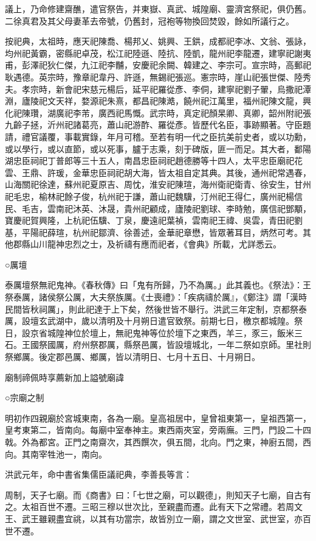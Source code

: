 議上，乃命修建齋醮，遣官祭告，并東嶽、真武、城隍廟、靈濟宮祭祀，俱仍舊。二徐真君及其父母妻革去帝號，仍舊封，冠袍等物換回焚毀，餘如所議行之。

按祀典，太祖時，應天祀陳喬、楊邦乂、姚興、王鉷，成都祀李冰、文翁、張詠，均州祀黃霸，密縣祀卓茂，松江祀陸遜、陸抗、陸凱，龍州祀李龍遷，建寧祀謝夷甫，彭澤祀狄仁傑，九江祀李黼，安慶祀余闕、韓建之、李宗可。宣宗時，高郵祀耿遇德。英宗時，豫章祀韋丹、許遜，無錫祀張巡。憲宗時，崖山祀張世傑、陸秀夫。孝宗時，新會祀宋慈元楊后，延平祀羅從彥、李侗，建寧祀劉子翬，烏撒祀潭淵，廬陵祀文天祥，婺源祀朱熹，都昌祀陳澔，饒州祀江萬里，福州祀陳文龍，興化祀陳瓚，湖廣祀李芾，廣西祀馬慨。武宗時，真定祀顏杲卿、真卿，韶州附祀張九齡子拯，沂州祀諸葛亮，蕭山祀游酢、羅從彥。皆歷代名臣，事跡顯著。守臣題請，禮官議覆，事載實錄，年月可稽。至若有明一代之臣抗美前史者，或以功勳，或以學行，或以直節，或以死事，臚于志乘，刻于碑版，匪一而足。其大者，鄱陽湖忠臣祠祀丁普郎等三十五人，南昌忠臣祠祀趙德勝等十四人，太平忠臣廟祀花雲、王鼎、許瑗，金華忠臣祠祀胡大海，皆太祖自定其典。其後，通州祀常遇春，山海關祀徐達，蘇州祀夏原吉、周忱，淮安祀陳瑄，海州衛祀衛青、徐安生，甘州祀毛忠，榆林祀餘子俊，杭州祀于謙，蕭山祀魏驥，汀州祀王得仁，廣州祀楊信民、毛吉，雲南祀沐英、沐晟，貴州祀顧成，廬陵祀劉球、李時勉，廣信祀鄧顒，寶慶祀賀興隆，上杭祀伍驥、丁泉，慶遠祀葉禎，雲南祀王禕、吳雲，青田祀劉基，平陽祀薛瑄，杭州祀鄒濟、徐善述，金華祀章懋，皆眾著耳目，炳然可考。其他郡縣山川龍神忠烈之士，及祈禱有應而祀者，《會典》所載，尤詳悉云。

○厲壇

泰厲壇祭無祀鬼神。《春秋傳》曰「鬼有所歸，乃不為厲。」此其義也。《祭法》：王祭泰厲，諸侯祭公厲，大夫祭族厲。《士喪禮》：「疾病禱於厲』，《鄭注》謂「漢時民間皆秋祠厲」，則此祀達于上下矣，然後世皆不舉行。洪武三年定制，京都祭泰厲，設壇玄武湖中，歲以清明及十月朔日遣官致祭。前期七日，檄京都城隍。祭日，設京省城隍神位於壇上，無祀鬼神等位於壇下之東西，羊三，豕三，飯米三石。王國祭國厲，府州祭郡厲，縣祭邑厲，皆設壇城北，一年二祭如京師。里社則祭鄉厲。後定郡邑厲、鄉厲，皆以清明日、七月十五日、十月朔日。


廟制禘佩時享薦新加上謚號廟諱

○宗廟之制

明初作四親廟於宮城東南，各為一廟。皇高祖居中，皇曾祖東第一，皇祖西第一，皇考東第二，皆南向。每廟中室奉神主。東西兩夾室，旁兩廡。三門，門設二十四戟。外為都宮。正門之南齋次，其西饌次，俱五間，北向。門之東，神廚五間，西向。其南宰牲池一，南向。

洪武元年，命中書省集儒臣議祀典，李善長等言：

周制，天子七廟。而《商書》曰：「七世之廟，可以觀德」，則知天子七廟，自古有之。太祖百世不遷。三昭三穆以世次比，至親盡而遷。此有天下之常禮。若周文王、武王雖親盡宜祧，以其有功當宗，故皆別立一廟，謂之文世室、武世室，亦百世不遷。

